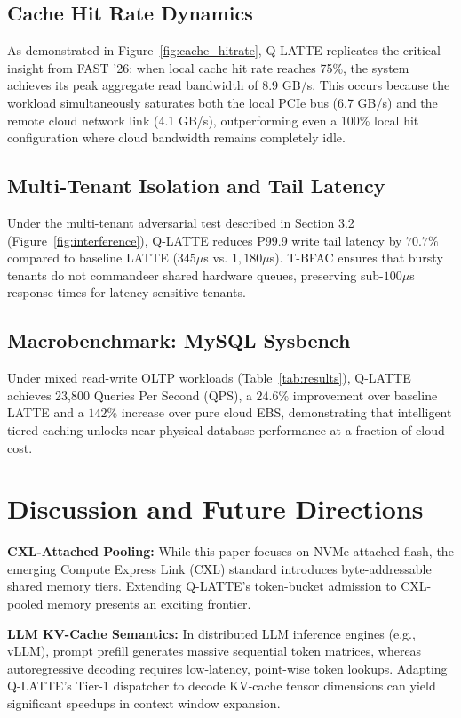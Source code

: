 \documentclass[10pt,twocolumn]{article}
\begin{document}
\subsection{Cache Hit Rate Dynamics}
As demonstrated in Figure~\ref{fig:cache_hitrate}, Q-LATTE replicates the critical insight from FAST '26: when local cache hit rate reaches 75\%, the system achieves its peak aggregate read bandwidth of 8.9 GB/s. This occurs because the workload simultaneously saturates both the local PCIe bus (6.7 GB/s) and the remote cloud network link (4.1 GB/s), outperforming even a 100\% local hit configuration where cloud bandwidth remains completely idle.

\subsection{Multi-Tenant Isolation and Tail Latency}
Under the multi-tenant adversarial test described in Section 3.2 (Figure~\ref{fig:interference}), Q-LATTE reduces P99.9 write tail latency by \textbf{$70.7\%$} compared to baseline LATTE ($345\mu$s vs. $1,180\mu$s). T-BFAC ensures that bursty tenants do not commandeer shared hardware queues, preserving sub-$100\mu$s response times for latency-sensitive tenants.

\subsection{Macrobenchmark: MySQL Sysbench}
Under mixed read-write OLTP workloads (Table~\ref{tab:results}), Q-LATTE achieves 23,800 Queries Per Second (QPS), a $24.6\%$ improvement over baseline LATTE and a $142\%$ increase over pure cloud EBS, demonstrating that intelligent tiered caching unlocks near-physical database performance at a fraction of cloud cost.

\section{Discussion and Future Directions}
\textbf{CXL-Attached Pooling:} While this paper focuses on NVMe-attached flash, the emerging Compute Express Link (CXL) standard introduces byte-addressable shared memory tiers. Extending Q-LATTE's token-bucket admission to CXL-pooled memory presents an exciting frontier.

\textbf{LLM KV-Cache Semantics:} In distributed LLM inference engines (e.g., vLLM), prompt prefill generates massive sequential token matrices, whereas autoregressive decoding requires low-latency, point-wise token lookups. Adapting Q-LATTE's Tier-1 dispatcher to decode KV-cache tensor dimensions can yield significant speedups in context window expansion.
\end{document}

